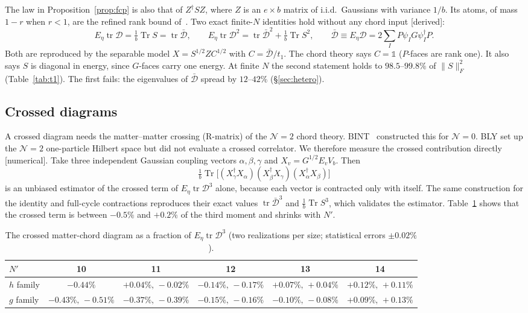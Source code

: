 \documentclass[11pt]{article}
\newcommand{\Tr}{\operatorname{Tr}}
\newcommand{\tr}{\operatorname{tr}}
\newcommand{\Np}{N'}
\newcommand{\one}{\mathds 1}
\newcommand{\Dc}{\mathcal D}
\newcommand{\Dbar}{\bar{\mathcal D}}
\newcommand{\tagbox}[2]{\textsf{\small\color{#1}[#2]}}
\newcommand{\DER}{\tagbox{cder}{derived}}
\newcommand{\NUM}{\tagbox{cnum}{numerical}}
\theoremstyle{plain}
\theoremstyle{remark}
\numberwithin{equation}{section}
\begin{document}
The law in Proposition~\ref{prop:fcp} is also that of $Z^\dagger SZ$, where $Z$ is an $e\times b$ matrix of i.i.d.\
Gaussians with variance $1/b$. Its atoms, of mass $1-r$ when $r<1$, are the refined rank bound of~\cite[\S8]{prog1013}.
Two exact finite-$N$ identities hold without any chord input \DER:
\begin{equation}\label{eq:exactmoments}
E_\eta\tr\Dc=\tfrac1b\Tr S=\tr\Dbar,\qquad
E_\eta\tr\Dc^2=\tr\Dbar^2+\tfrac1b\Tr S^2,\qquad \Dbar\equiv E_\eta\Dc=2\textstyle\sum_IP\psi_IG\psi_I^\dagger P .
\end{equation}
Both are reproduced by the separable model $X=S^{1/2}ZC^{1/2}$ with $C=\Dbar/t_1$. The chord theory says $C=\one$
($P$-faces are rank one). It also says $S$ is diagonal in energy, since $G$-faces carry one energy. At finite $N$ the
second statement holds to $98.5$--$99.8\%$ of $\|S\|_F^2$ (Table~\ref{tab:t1}). The first fails: the eigenvalues of
$\Dbar$ spread by $12$--$42\%$ (\S\ref{sec:hetero}).

\subsection{Crossed diagrams}\label{sec:crossed}

A crossed diagram needs the matter--matter crossing (R-matrix) of the $\mathcal N=2$ chord theory. BINT~\cite{BINT}
constructed this for $\mathcal N=0$. BLY set up the $\mathcal N=2$ one-particle Hilbert space but did not evaluate a
crossed correlator. We therefore measure the crossed contribution directly \NUM. Take three independent Gaussian
coupling vectors $\alpha,\beta,\gamma$ and $X_v=G^{1/2}E_vV_b$. Then
\[
\tfrac1b\Tr\big[(X_\gamma^\dagger X_\alpha)(X_\beta^\dagger X_\gamma)(X_\alpha^\dagger X_\beta)\big]
\]
is an unbiased estimator of the crossed term of $E_\eta\tr\Dc^3$ alone, because each vector is contracted only with
itself. The same construction for the identity and full-cycle contractions reproduces their exact values $\tr\Dbar^3$
and $\frac1b\Tr S^3$, which validates the estimator. Table~\ref{tab:crossing} shows that the crossed term is between
$-0.5\%$ and $+0.2\%$ of the third moment and shrinks with $\Np$.

\begin{table}[ht]
\centering\small
\caption{The crossed matter-chord diagram as a fraction of $E_\eta\tr\Dc^3$ (two realizations per size; statistical
errors $\pm0.02\%$).}
\label{tab:crossing}
\setlength{\tabcolsep}{4pt}
\begin{tabular}{lccccc}\toprule
$\Np$ & 10 & 11 & 12 & 13 & 14\\\midrule
$h$ family & $-0.44\%$ & $+0.04\%,\,-0.02\%$ & $-0.14\%,\,-0.17\%$ & $+0.07\%,\,+0.04\%$ & $+0.12\%,\,+0.11\%$\\
$g$ family & $-0.43\%,\,-0.51\%$ & $-0.37\%,\,-0.39\%$ & $-0.15\%,\,-0.16\%$ & $-0.10\%,\,-0.08\%$ & $+0.09\%,\,+0.13\%$\\\bottomrule
\end{tabular}
\end{table}
\end{document}
